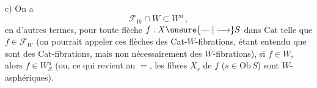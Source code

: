 c)  On a
\[
\mathcal F_W\cap W\subset W^u\,,
\]
en d'autres termes, pour toute flèche
$f:X\unsure{\mathrel{\text{---}}|\longrightarrow} S$ dans $\mathrm{Cat}$ telle que $f\in\mathcal F_W$
(on pourrait appeler ces flèches des Cat-$W$-fibrations, étant entendu que  sont  des
Cat-fibrations, mais non nécessairement
des $W$-fibrations), si $f\in W$, alors
$f\in W_S^u$ (ou, ce qui revient au $=$, les fibres
$X_s$ de $f$ ($s\in\mathrm{Ob}\,S$) sont $W$-asphériques).


